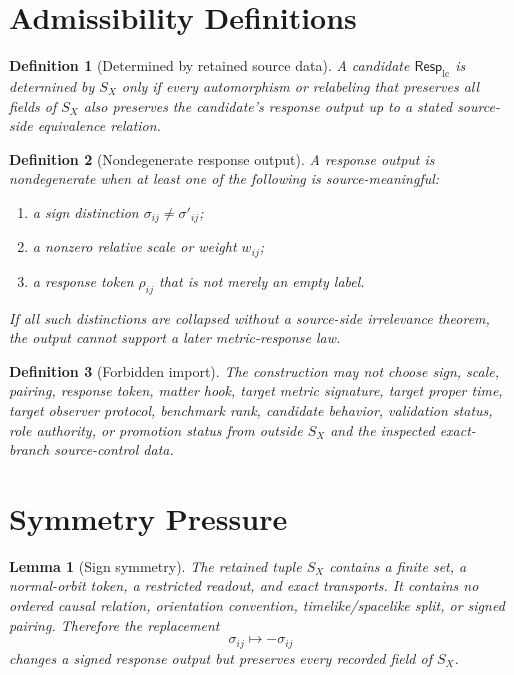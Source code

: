 \documentclass[11pt]{article}
\newcommand{\RespLC}{\mathsf{Resp}_{\mathrm{lc}}}
\newtheorem{definition}{Definition}
\newtheorem{lemma}{Lemma}
\begin{document}
\section{Admissibility Definitions}

\begin{definition}[Determined by retained source data]
A candidate \(\RespLC\) is determined by \(S_X\) only if every
automorphism or relabeling that preserves all fields of
\(S_X\) also preserves the candidate's response output up to a stated
source-side equivalence relation.
\end{definition}

\begin{definition}[Nondegenerate response output]
A response output is nondegenerate when at least one of the following
is source-meaningful:
\begin{enumerate}
    \item a sign distinction \(\sigma_{ij}\neq \sigma'_{ij}\);
    \item a nonzero relative scale or weight \(w_{ij}\);
    \item a response token \(\rho_{ij}\) that is not merely an empty
    label.
\end{enumerate}
If all such distinctions are collapsed without a source-side
irrelevance theorem, the output cannot support a later
metric-response law.
\end{definition}

\begin{definition}[Forbidden import]
The construction may not choose sign, scale, pairing, response token,
matter hook, target metric signature, target proper time, target
observer protocol, benchmark rank, candidate behavior, validation
status, role authority, or promotion status from outside \(S_X\) and
the inspected exact-branch source-control data.
\end{definition}

\section{Symmetry Pressure}

\begin{lemma}[Sign symmetry]
The retained tuple \(S_X\) contains a finite set, a normal-orbit
token, a restricted readout, and exact transports. It contains no
ordered causal relation, orientation convention, timelike/spacelike
split, or signed pairing. Therefore the replacement
\[
    \sigma_{ij}\mapsto -\sigma_{ij}
\]
changes a signed response output but preserves every recorded field of
\(S_X\).
\end{lemma}
\end{document}
